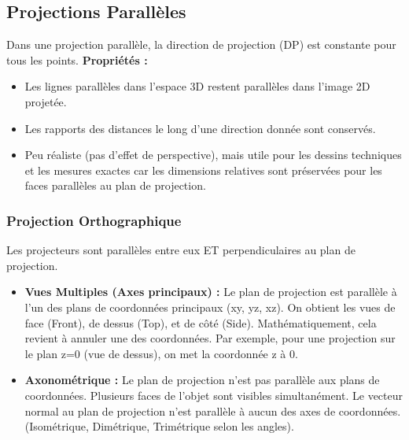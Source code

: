 \documentclass{article}
\begin{document}
\subsection{Projections Parallèles}
Dans une projection parallèle, la direction de projection (DP) est constante pour tous les points.
\textbf{Propriétés :}
\begin{itemize}
    \item Les lignes parallèles dans l'espace 3D restent parallèles dans l'image 2D projetée.
    \item Les rapports des distances le long d'une direction donnée sont conservés.
    \item Peu réaliste (pas d'effet de perspective), mais utile pour les dessins techniques et les mesures exactes car les dimensions relatives sont préservées pour les faces parallèles au plan de projection.
\end{itemize}

\subsubsection{Projection Orthographique}
Les projecteurs sont parallèles entre eux ET perpendiculaires au plan de projection.
\begin{itemize}
    \item \textbf{Vues Multiples (Axes principaux) :} Le plan de projection est parallèle à l'un des plans de coordonnées principaux (xy, yz, xz). On obtient les vues de face (Front), de dessus (Top), et de côté (Side). Mathématiquement, cela revient à annuler une des coordonnées. Par exemple, pour une projection sur le plan z=0 (vue de dessus), on met la coordonnée z à 0.
    \item \textbf{Axonométrique :} Le plan de projection n'est pas parallèle aux plans de coordonnées. Plusieurs faces de l'objet sont visibles simultanément. Le vecteur normal au plan de projection n'est parallèle à aucun des axes de coordonnées. (Isométrique, Dimétrique, Trimétrique selon les angles).
\end{itemize}
\end{document}
